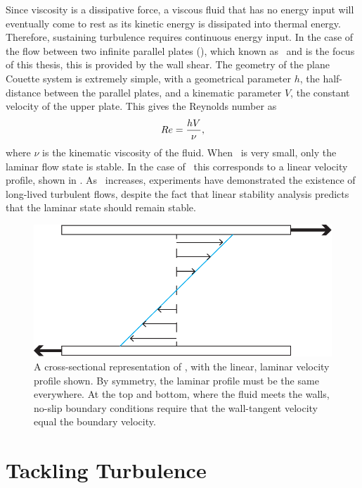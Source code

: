 Since viscosity is a dissipative force, a viscous fluid that has no energy input will eventually come to rest as its kinetic energy is dissipated into thermal energy. Therefore, sustaining turbulence requires continuous energy input. In the case of the flow between two infinite parallel plates (), which known as \pCf\ and is the focus of this thesis, this is provided by the wall shear. The geometry of the plane Couette system is extremely simple, with a geometrical parameter $h$, the half-distance between the parallel plates, and a kinematic parameter $V$, the constant velocity of the upper plate. This gives the Reynolds number as 
\begin{equation}
Re = \dfrac{hV}{\nu},
\end{equation}
where $\nu$ is the kinematic viscosity of the fluid. When \ReN~is very small, only the laminar flow state is stable. In the case of \pCf\ this corresponds to a linear velocity profile, shown in . As \ReN~increases, experiments have demonstrated the existence of long-lived turbulent flows, despite the fact that linear stability analysis predicts that the laminar state should remain stable.
\begin{figure}
\centerline{
\includegraphics[scale=0.6]{Figs/planeCouetteMeanFlow}}
\caption{A cross-sectional representation of \pCf, with the linear, laminar velocity profile shown. By symmetry, the laminar profile must be the same everywhere. At the top and bottom, where the fluid meets the walls, no-slip boundary conditions require that the wall-tangent velocity equal the boundary velocity.}\label{fig:planeCouetteBulk}
\end{figure}

\section{Tackling Turbulence} 


